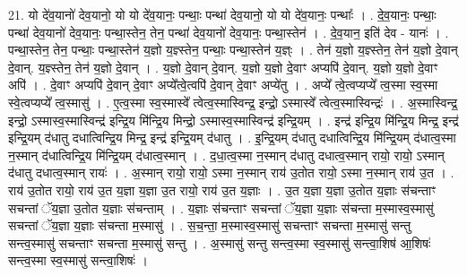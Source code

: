 \documentclass[17pt]{extarticle}
\begin{document}
21. यो दे॑व॒यानो॑ देव॒यानो॒ यो यो दे॑व॒यानः॒ पन्थाः॒ पन्था॑ देव॒यानो॒ यो यो दे॑व॒यानः॒ पन्थाः᳚ । . दे॒व॒यानः॒ पन्थाः॒ पन्था॑ देव॒यानो॑ देव॒यानः॒ पन्था॒स्तेन॒ तेन॒ पन्था॑ देव॒यानो॑ देव॒यानः॒ पन्था॒स्तेन॑ । . दे॒व॒यान॒ इति॑ देव - यानः॑ । . पन्था॒स्तेन॒ तेन॒ पन्थाः॒ पन्था॒स्तेन॑ य॒ज्ञो य॒ज्ञ्स्तेन॒ पन्थाः॒ पन्था॒स्तेन॑ य॒ज्ञ्ः । . तेन॑ य॒ज्ञो य॒ज्ञ्स्तेन॒ तेन॑ य॒ज्ञो दे॒वान् दे॒वान्. य॒ज्ञ्स्तेन॒ तेन॑ य॒ज्ञो दे॒वान् । . य॒ज्ञो दे॒वान् दे॒वान्. य॒ज्ञो य॒ज्ञो दे॒वाꣳ अप्यपि॑ दे॒वान्. य॒ज्ञो य॒ज्ञो दे॒वाꣳ अपि॑ । . दे॒वाꣳ अप्यपि॑ दे॒वान् दे॒वाꣳ अप्ये᳚त्वे॒त्वपि॑ दे॒वान् दे॒वाꣳ अप्ये॑तु । . अप्ये᳚ त्वे॒त्वप्यप्ये᳚ त्व॒स्मा स्व॒स्मा स्वे॒त्वप्यप्ये᳚ त्व॒स्मासु॑ । . ए॒त्व॒स्मा स्व॒स्मास्वे᳚ त्वेत्व॒स्मास्विन्द्र॒ इन्द्रो॒ ऽस्मास्वे᳚ त्वेत्व॒स्मास्विन्द्रः॑ । . अ॒स्मास्विन्द्र॒ इन्द्रो॒ ऽस्मास्व॒स्मास्विन्द्र॑ इन्द्रि॒य मि॑न्द्रि॒य मिन्द्रो॒ ऽस्मास्व॒स्मास्विन्द्र॑ इन्द्रि॒यम् । . इन्द्र॑ इन्द्रि॒य मि॑न्द्रि॒य मिन्द्र॒ इन्द्र॑ इन्द्रि॒यम् द॑धातु दधात्विन्द्रि॒य मिन्द्र॒ इन्द्र॑ इन्द्रि॒यम् द॑धातु । . इ॒न्द्रि॒यम् द॑धातु दधात्विन्द्रि॒य मि॑न्द्रि॒यम् द॑धात्व॒स्मा न॒स्मान् द॑धात्विन्द्रि॒य मि॑न्द्रि॒यम् द॑धात्व॒स्मान् । . द॒धा॒त्व॒स्मा न॒स्मान् द॑धातु दधात्व॒स्मान् रायो॒ रायो॒ ऽस्मान् द॑धातु दधात्व॒स्मान् रायः॑ । . अ॒स्मान् रायो॒ रायो॒ ऽस्मा न॒स्मान् राय॑ उ॒तोत रायो॒ ऽस्मा न॒स्मान् राय॑ उ॒त । . राय॑ उ॒तोत रायो॒ राय॑ उ॒त य॒ज्ञा य॒ज्ञा उ॒त रायो॒ राय॑ उ॒त य॒ज्ञाः । . उ॒त य॒ज्ञा य॒ज्ञा उ॒तोत य॒ज्ञाः स॑चन्ताꣳ सचन्तां ॅय॒ज्ञा उ॒तोत य॒ज्ञाः स॑चन्ताम् । . य॒ज्ञाः स॑चन्ताꣳ सचन्तां ॅय॒ज्ञा य॒ज्ञाः स॑चन्ता म॒स्मास्व॒स्मासु॑ सचन्तां ॅय॒ज्ञा य॒ज्ञाः स॑चन्ता म॒स्मासु॑ । . स॒च॒न्ता॒ म॒स्मास्व॒स्मासु॑ सचन्ताꣳ सचन्ता म॒स्मासु॑ सन्तु सन्त्व॒स्मासु॑ सचन्ताꣳ सचन्ता म॒स्मासु॑ सन्तु । . अ॒स्मासु॑ सन्तु सन्त्व॒स्मा स्व॒स्मासु॑ सन्त्वा॒शिष॑ आ॒शिषः॑ सन्त्व॒स्मा स्व॒स्मासु॑ सन्त्वा॒शिषः॑ । \newline
\end{document}
